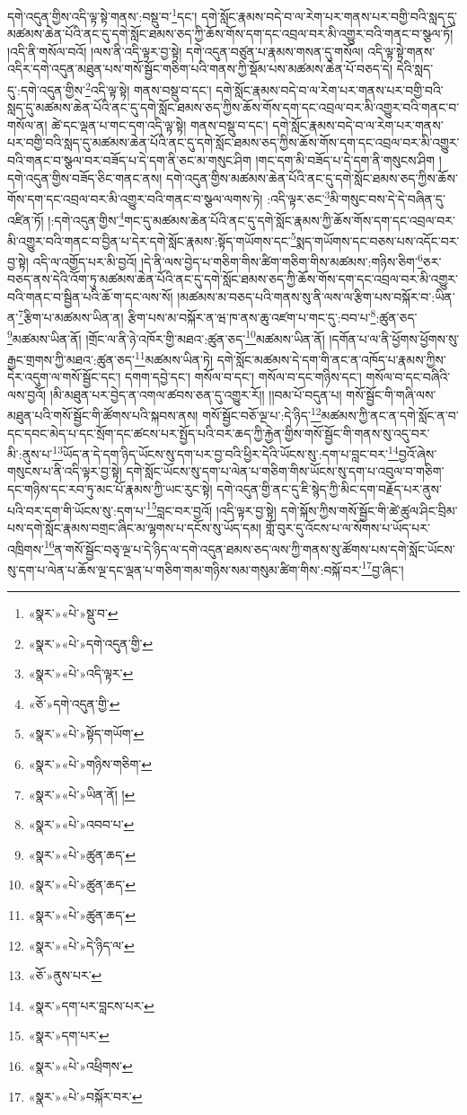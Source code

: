 དགེ་འདུན་གྱིས་འདི་ལྟ་སྟེ་གནས་:བསྡུ་བ་\footnote{«སྣར་»«པེ་»སྡུ་བ་}དང་། དགེ་སློང་རྣམས་བདེ་བ་ལ་རེག་པར་གནས་པར་བགྱི་བའི་སླད་དུ་མཚམས་ཆེན་པོའི་ནང་དུ་དགེ་སློང་ཐམས་ཅད་ཀྱི་ཆོས་གོས་དག་དང་འབྲལ་བར་མི་འགྱུར་བའི་གནང་བ་སྩལ་ཏོ། །འདི་ནི་གསོལ་བའོ། །ལས་ནི་འདི་ལྟར་བྱ་སྟེ། དགེ་འདུན་བཙུན་པ་རྣམས་གསན་དུ་གསོལ། འདི་ལྟ་སྟེ་གནས་འདིར་དགེ་འདུན་མཐུན་པས་གསོ་སྦྱོང་གཅིག་པའི་གནས་ཀྱི་སྡོམ་པས་མཚམས་ཆེན་པོ་བཅད་དེ། དེའི་སླད་དུ་:དགེ་འདུན་གྱིས་\footnote{«སྣར་»«པེ་»དགེ་འདུན་གྱི་}འདི་ལྟ་སྟེ། གནས་བསྡུ་བ་དང་། དགེ་སློང་རྣམས་བདེ་བ་ལ་རེག་པར་གནས་པར་བགྱི་བའི་སླད་དུ་མཚམས་ཆེན་པོའི་ནང་དུ་དགེ་སློང་ཐམས་ཅད་ཀྱིས་ཆོས་གོས་དག་དང་འབྲལ་བར་མི་འགྱུར་བའི་གནང་བ་གསོལ་ན། ཚེ་དང་ལྡན་པ་གང་དག་འདི་ལྟ་སྟེ། གནས་བསྡུ་བ་དང་། དགེ་སློང་རྣམས་བདེ་བ་ལ་རེག་པར་གནས་པར་བགྱི་བའི་སླད་དུ་མཚམས་ཆེན་པོའི་ནང་དུ་དགེ་སློང་ཐམས་ཅད་ཀྱིས་ཆོས་གོས་དག་དང་འབྲལ་བར་མི་འགྱུར་བའི་གནང་བ་སྩལ་བར་བཟོད་པ་དེ་དག་ནི་ཅང་མ་གསུང་ཤིག །གང་དག་མི་བཟོད་པ་དེ་དག་ནི་གསུངས་ཤིག །དགེ་འདུན་གྱིས་བཟོད་ཅིང་གནང་ནས། དགེ་འདུན་གྱིས་མཚམས་ཆེན་པོའི་ནང་དུ་དགེ་སློང་ཐམས་ཅད་ཀྱིས་ཆོས་གོས་དག་དང་འབྲལ་བར་མི་འགྱུར་བའི་གནང་བ་སྩལ་ལགས་ཏེ། :འདི་ལྟར་ཅང་\footnote{«སྣར་»«པེ་»འདི་ལྟར་}མི་གསུང་བས་དེ་དེ་བཞིན་དུ་འཛིན་ཏོ། །:དགེ་འདུན་གྱིས་\footnote{«ཅོ་»དགེ་འདུན་གྱི་}གང་དུ་མཚམས་ཆེན་པོའི་ནང་དུ་དགེ་སློང་རྣམས་ཀྱི་ཆོས་གོས་དག་དང་འབྲལ་བར་མི་འགྱུར་བའི་གནང་བ་བྱིན་པ་དེར་དགེ་སློང་རྣམས་:སྟོད་གཡོགས་དང་\footnote{«སྣར་»«པེ་»སྟོད་གཡོག་}སྨད་གཡོགས་དང་བཅས་པས་འདོང་བར་བྱ་སྟེ། འདི་ལ་འགྱོད་པར་མི་བྱའོ། །དེ་ནི་ལས་བྱེད་པ་གཅིག་གིས་ཚིག་གཅིག་གིས་མཚམས་:གཉིས་ཅིག་\footnote{«སྣར་»«པེ་»གཉིས་གཅིག་}ཅར་བཅད་ནས་དེའི་འོག་ཏུ་མཚམས་ཆེན་པོའི་ནང་དུ་དགེ་སློང་ཐམས་ཅད་ཀྱི་ཆོས་གོས་དག་དང་འབྲལ་བར་མི་འགྱུར་བའི་གནང་བ་སྦྱིན་པའི་ཆོ་ག་དང་ལས་སོ། །མཚམས་མ་བཅད་པའི་གནས་སུ་ནི་ལས་ལ་རྩིག་པས་བསྐོར་བ་:ཡིན་ན་\footnote{«སྣར་»«པེ་»ཡིན་ནོ། །}རྩིག་པ་མཚམས་ཡིན་ན། རྩིག་པས་མ་བསྐོར་ན་ཝ་ཁ་ནས་ཆུ་འཛག་པ་གང་དུ་:བབ་པ་\footnote{«སྣར་»«པེ་»འབབ་པ་}:ཚུན་ཅད་\footnote{«སྣར་»«པེ་»ཚུན་ཆད་}མཚམས་ཡིན་ནོ། །གྲོང་ལ་ནི་ཉེ་འཁོར་གྱི་མཐའ་:ཚུན་ཅད་\footnote{«སྣར་»«པེ་»ཚུན་ཆད་}མཚམས་ཡིན་ནོ། །དགོན་པ་ལ་ནི་ཕྱོགས་ཕྱོགས་སུ་རྒྱང་གྲགས་ཀྱི་མཐའ་:ཚུན་ཅད་\footnote{«སྣར་»«པེ་»ཚུན་ཆད་}མཚམས་ཡིན་ཏེ། དགེ་སློང་མཚམས་དེ་དག་གི་ནང་ན་འཁོད་པ་རྣམས་ཀྱིས་དེར་འདུག་ལ་གསོ་སྦྱོང་དང་། དགག་དབྱེ་དང་། གསོལ་བ་དང་། གསོལ་བ་དང་གཉིས་དང་། གསོལ་བ་དང་བཞིའི་ལས་བྱའོ། །མི་མཐུན་པར་བྱེད་ན་འགལ་ཚབས་ཅན་དུ་འགྱུར་རོ།། །།བམ་པོ་བདུན་པ། གསོ་སྦྱོང་གི་གཞི་ལས་མཐུན་པའི་གསོ་སྦྱོང་གི་ཚོགས་པའི་སྐབས་ནས། གསོ་སྦྱོང་བཅོ་ལྔ་པ་:དེ་ཉིད་\footnote{«སྣར་»«པེ་»དེ་ཉིད་ལ་}མཚམས་ཀྱི་ནང་ན་དགེ་སློང་ན་བ་དང་དབང་མེད་པ་དང་སྲོག་དང་ཚངས་པར་སྤྱོད་པའི་བར་ཆད་ཀྱི་རྐྱེན་གྱིས་གསོ་སྦྱོང་གི་གནས་སུ་འདུ་བར་མི་:ནུས་པ་\footnote{«ཅོ་»ནུས་པར་}ཡོད་ན་དེ་དག་ཉིད་ཡོངས་སུ་དག་པར་བྱ་བའི་ཕྱིར་དེའི་ཡོངས་སུ་:དག་པ་བླང་བར་\footnote{«སྣར་»དག་པར་བླངས་པར་}བྱའོ་ཞེས་གསུངས་པ་ནི་འདི་ལྟར་བྱ་སྟེ། དགེ་སློང་ཡོངས་སུ་དག་པ་ལེན་པ་གཅིག་གིས་ཡོངས་སུ་དག་པ་འབུལ་བ་གཅིག་དང་གཉིས་དང་རབ་ཏུ་མང་པོ་རྣམས་ཀྱི་ཡང་རུང་སྟེ། དགེ་འདུན་གྱི་ནང་དུ་ཇི་སྙེད་ཀྱི་མིང་དག་བརྗོད་པར་ནུས་པའི་བར་དག་གི་ཡོངས་སུ་:དག་པ་\footnote{«སྣར་»དག་པར་}བླང་བར་བྱའོ། །འདི་ལྟར་བྱ་སྟེ། དགེ་སྐོས་ཀྱིས་གསོ་སྦྱོང་གི་ཚེ་ཚུལ་ཤིང་བྲིམ་པས་དགེ་སློང་རྣམས་བགྲང་ཞིང་མ་ལྷགས་པ་དངོས་སུ་ཡོད་དམ། གློ་བུར་དུ་འོངས་པ་ལ་སོགས་པ་ཡོད་པར་འཁྲིགས་\footnote{«སྣར་»«པེ་»འཕྲིགས་}ན་གསོ་སྦྱོང་བཅྭ་ལྔ་པ་དེ་ཉིད་ལ་དགེ་འདུན་ཐམས་ཅད་ལས་ཀྱི་གནས་སུ་ཚོགས་པས་དགེ་སློང་ཡོངས་སུ་དག་པ་ལེན་པ་ཆོས་ལྔ་དང་ལྡན་པ་གཅིག་གམ་གཉིས་སམ་གསུམ་ཚིག་གིས་:བསྐོ་བར་\footnote{«སྣར་»«པེ་»བསྐོར་བར་}བྱ་ཞིང་། 